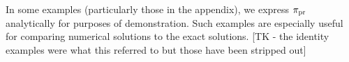 %
%
%


In some examples (particularly those in the appendix), we express $\operatorname*{\pi_{pr}}$ analytically for purposes of demonstration.
Such examples are especially useful for comparing numerical solutions to the exact solutions.
[TK - the identity examples were what this referred to but those have been stripped out]

